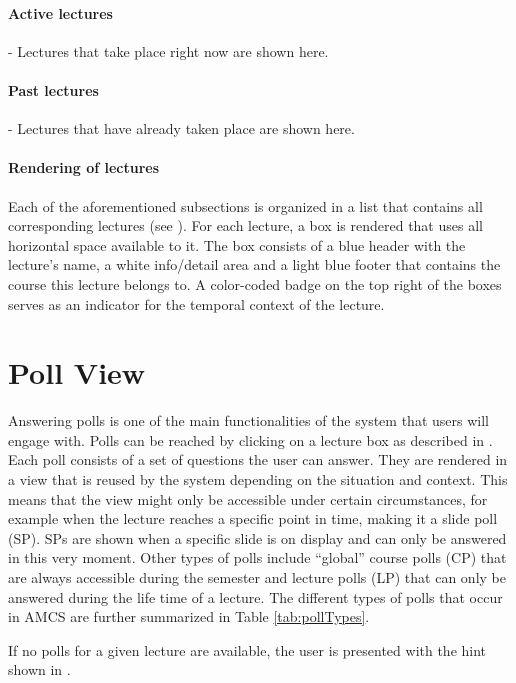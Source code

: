 \paragraph{Active lectures} - Lectures that take place right now are shown here.
\paragraph{Past lectures} - Lectures that have already taken place are shown here.

\paragraph{Rendering of lectures}

Each of the aforementioned subsections is organized in a list that contains all corresponding lectures (see \todosct). For each lecture, a box is rendered that uses all horizontal space available to it. The box consists of a blue header with the lecture's name, a white info/detail area and a light blue footer that contains the course this lecture belongs to.
A color-coded badge on the top right of the boxes serves as an indicator for the temporal context of the lecture.




\section{Poll View}
Answering polls is one of the main functionalities of the system that users will engage with.
Polls can be reached by clicking on a lecture box as described in \todosct.
Each poll consists of a set of questions the user can answer. They are rendered in a view that is reused  by the system depending on the situation and context. This means that the view might only be accessible under certain circumstances, for example when the lecture reaches a specific point in time, making it a slide poll (SP). SPs are shown when a specific slide is on display and can only be answered in this very moment. Other types of polls include “global” course polls (CP) that are always accessible during the semester and lecture polls (LP) that can only be answered during the life time of a lecture. The different types of polls that occur in AMCS are further summarized in Table \ref{tab:pollTypes}.

If no polls for a given lecture are available, the user is presented with the hint shown in \todogrf.

